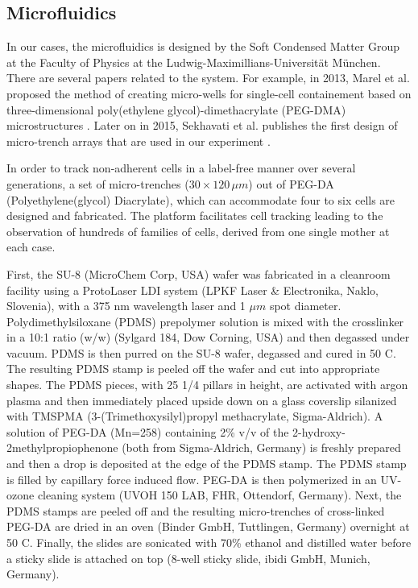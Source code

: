 \documentclass[pdftex,12pt,a4paper]{report}
\begin{document}
\subsection{Microfluidics}
\label{subsection:microfluid_env}

In our cases, the microfluidics is designed by the Soft Condensed Matter Group at the  Faculty of Physics at the Ludwig-Maximillians-Universit\"at M\"unchen. There are several papers related to the system. For example, in 2013, Marel et al. proposed the method of creating micro-wells for single-cell containement based on three-dimensional poly(ethylene glycol)-dimethacrylate (PEG-DMA) microstructures \cite{marel2013arraying}. Later on in 2015, Sekhavati et al. publishes the first design of micro-trench arrays that are used in our experiment \cite{sekhavati2015marker, sekhavati2015dynamic}.

In order to track non-adherent cells in a label-free manner over several generations, a set of micro-trenches ($30 \times 120 \, \mu m$) out of PEG-DA (Polyethylene(glycol) Diacrylate), which can accommodate four to six cells are designed and fabricated. The platform facilitates cell tracking leading to the observation of hundreds of families of cells, derived from one single mother at each case.

First, the SU-8 (MicroChem Corp, USA) wafer was fabricated in a cleanroom facility using a ProtoLaser LDI system (LPKF Laser \& Electronika, Naklo, Slovenia), with a 375 nm wavelength laser and 1 $\mu m$ spot diameter.
Polydimethylsiloxane (PDMS) prepolymer solution is mixed with the crosslinker in a 10:1 ratio (w/w) (Sylgard 184, Dow Corning, USA) and then degassed under vacuum. PDMS is then purred on the SU-8 wafer, degassed and cured in 50 \degree C. The resulting PDMS stamp is peeled off the wafer and cut into appropriate shapes. The PDMS pieces, with 25 1/4 pillars in height, are activated with argon plasma and then immediately placed upside down on a glass coverslip  silanized with TMSPMA (3-(Trimethoxysilyl)propyl methacrylate, Sigma-Aldrich). A solution of PEG-DA (Mn=258) containing 2\% v/v of the 2-hydroxy-2methylpropiophenone (both from Sigma-Aldrich, Germany) is freshly prepared and then a drop is deposited at the edge of the PDMS stamp. The PDMS stamp is filled by capillary force induced flow. PEG-DA is then polymerized in an UV-ozone cleaning system (UVOH 150 LAB, FHR, Ottendorf, Germany). Next, the PDMS stamps are peeled off and the resulting micro-trenches of cross-linked PEG-DA are dried in an oven (Binder GmbH, Tuttlingen, Germany) overnight at 50 \degree C. Finally, the slides are sonicated with 70\% ethanol and distilled water before a sticky slide is attached on top (8-well sticky slide, ibidi GmbH, Munich, Germany).
\end{document}
